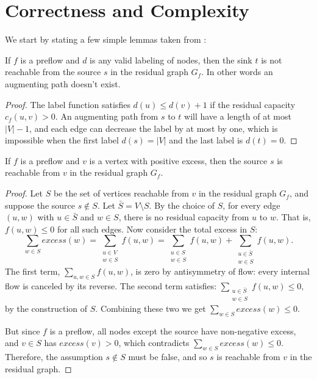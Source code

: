 \section{Correctness and Complexity}
We start by stating a few simple lemmas taken from \cite{PushRelabel}:

\begin{lemma}\label{lem:aug}
 If $f$ is a preflow and $d$ is any valid labeling of nodes, then the sink $t$ is
not reachable from the source $s$ in the residual graph $G_f$. In other words an augmenting path doesn't exist.
\end{lemma}

\begin{proof}
The label function satisfies $d(u) \leq d(v) + 1$ if the residual capacity $c_f(u,v) > 0$. An augmenting path from $s$ to $t$ will have a length of at most $|V| - 1$, and each edge can decrease the label by at most by one, which is impossible when the first label $d(s) = |V|$ and the last label is $d(t) = 0$.
\end{proof}

\begin{lemma}\label{lem:path}
If $f$ is a preflow and $v$ is a vertex with positive excess, then the source $s$ is reachable from $v$ in the residual graph $G_f$.
\end{lemma}

\begin{proof}
Let $S$ be the set of vertices reachable from $v$ in the residual graph $G_f$, and suppose the source $s \notin S$. Let $\bar{S} = V \setminus S$. By the choice of $S$, for every edge $(u, w)$ with $u \in \bar{S}$ and $w \in S$, there is no residual capacity from $u$ to $w$. That is, $f(u, w) \leq 0$ for all such edges.
Now consider the total excess in $S$:
$$
\sum_{w \in S} excess(w) = \sum_{\substack{u \in V \\ w \in S}}f(u, w) = \sum_{\substack{u \in S \\ w \in S}} f(u, w) + \sum_{\substack{u \in \bar{S} \\ w \in S}} f(u, w).
$$
The first term, $\sum_{u, w \in S} f(u, w)$, is zero by antisymmetry of flow: every internal flow is canceled by its reverse. The second term satisfies: $\sum_{\substack{u \in \bar{S} \\ w \in S}} f(u, w) \leq 0,$
by the construction of $S$. Combining these two we get $\sum_{w \in S} excess(w) \leq 0.$

But since $f$ is a preflow, all nodes except the source have non-negative excess, and $v \in S$ has $excess(v) > 0$, which contradicts $\sum_{w \in S} excess(w) \leq 0$. Therefore, the assumption $s \notin S$ must be false, and so $s$ is reachable from $v$ in the residual graph.
\end{proof}

